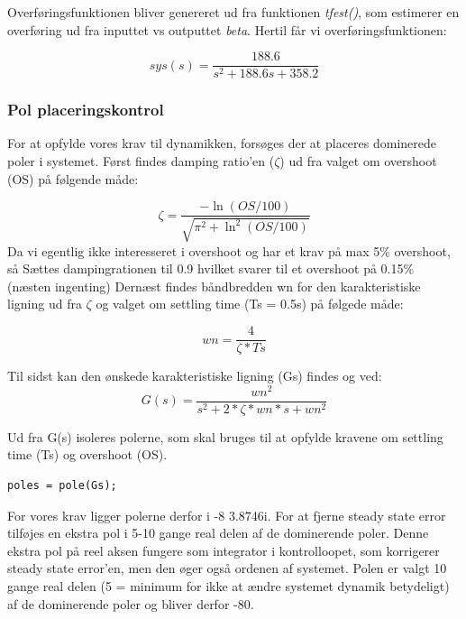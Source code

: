 Overføringsfunktionen bliver genereret ud fra funktionen \textit{tfest()}, som estimerer en overføring ud fra inputtet vs outputtet \textit{beta}. Hertil får vi overføringsfunktionen:

\begin{equation}
sys(s) = \frac{188.6}{s^2 + 188.6 s + 358.2}
\end{equation}
    

\subsubsection{Pol placeringskontrol}
For at opfylde vores krav til dynamikken, forsøges der at placeres dominerede poler i systemet. Først findes damping ratio'en ($ \zeta $) ud fra valget om overshoot (OS) på følgende måde: 

\begin{equation}
\zeta = \frac{-\ln(OS/100)}{\sqrt{\pi^2+\ln^2(OS/100)}}
\end{equation} 
Da vi egentlig ikke interesseret i overshoot og har et krav på max 5\% overshoot, så Sættes dampingrationen til 0.9 hvilket svarer til et overshoot på 0.15\% (næsten ingenting)
Dernæst findes båndbredden wn for den karakteristiske ligning ud fra $ \zeta $ og valget om settling time (Ts = 0.5s) på følgede måde:

\begin{equation}
wn = \frac{4}{\zeta*Ts}
\end{equation} 

Til sidst kan den ønskede karakteristiske ligning (Gs) findes og ved:
\begin{equation}
G(s) = \frac{wn^2}{s^2+2*\zeta*wn*s+wn^2}
\end{equation}

Ud fra G(s) isoleres polerne, som skal bruges til at opfylde kravene om settling time (Ts) og overshoot (OS).
\begin{lstlisting}[frame=single]
poles = pole(Gs);
\end{lstlisting}


For vores krav ligger polerne  derfor i -8 \textpm3.8746i. For at fjerne steady state error tilføjes en ekstra pol i 5-10 gange real delen af de dominerende poler. Denne ekstra pol på reel aksen fungere som integrator i kontrolloopet, som korrigerer steady state error'en, men den øger også ordenen af systemet. Polen er valgt 10 gange real delen (5 = minimum for ikke at ændre systemet dynamik betydeligt) af de dominerende poler og bliver derfor -80.


